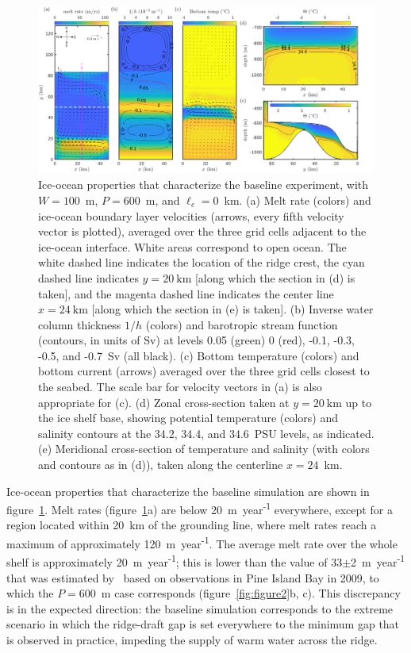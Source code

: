 \documentclass[draft]{agujournal2019}
\begin{document}
\begin{figure}
    \centering
    \includegraphics[width = \textwidth]{../make_figures/plots/figure3.pdf}
    \caption{Ice-ocean properties that characterize the baseline experiment, with $W = 100$~m, $P = 600$~m, and $\ell_c = 0$~km. (a) Melt rate (colors) and ice-ocean boundary layer velocities (arrows, every fifth velocity vector is plotted), averaged over the three grid cells adjacent to the ice-ocean interface. White areas correspond to open ocean. The white dashed line indicates the location of the ridge crest, the cyan dashed line indicates $y=20~\text{km}$ [along which the section in (d) is taken], and the magenta dashed line indicates the center line $x = 24~\text{km}$ [along which the section in (e) is taken]. (b) Inverse water column thickness $1/h$ (colors) and barotropic stream function (contours, in units of Sv) at levels 0.05 (green) 0 (red), -0.1, -0.3, -0.5, and -0.7~Sv (all black). (c) Bottom temperature (colors) and bottom current (arrows) averaged over the three grid cells closest to the seabed. The scale bar for velocity vectors in (a) is also appropriate for (c). (d) Zonal cross-section taken at $y=20~\text{km}$ up to the ice shelf base, showing potential temperature (colors) and salinity contours at the 34.2, 34.4, and 34.6~PSU levels, as indicated. (e) Meridional cross-section of temperature and salinity (with colors and contours as in (d)), taken along the centerline $x = 24$~km.}
    \label{fig:figure3}
\end{figure}

Ice-ocean properties that characterize the baseline simulation are shown in figure~\ref{fig:figure3}. Melt rates (figure~\ref{fig:figure3}a) are below  20~m~year\textsuperscript{-1} everywhere, except for a region located within 20~km of the grounding line, where melt rates reach a maximum of approximately 120~m~year\textsuperscript{-1}. The average melt rate over the whole shelf is approximately 20~m~year\textsuperscript{-1}; this is lower than the value of 33$\pm$2~m~year\textsuperscript{-1} that was estimated by~ based on observations in Pine Island Bay in 2009, to which the $P=600$~m case corresponds (figure~\ref{fig:figure2}b, c). This discrepancy is in the expected direction: the baseline simulation corresponds to the extreme scenario in which the ridge-draft gap is set everywhere to the minimum gap that is observed in practice, impeding the supply of warm water across the ridge.
\end{document}
